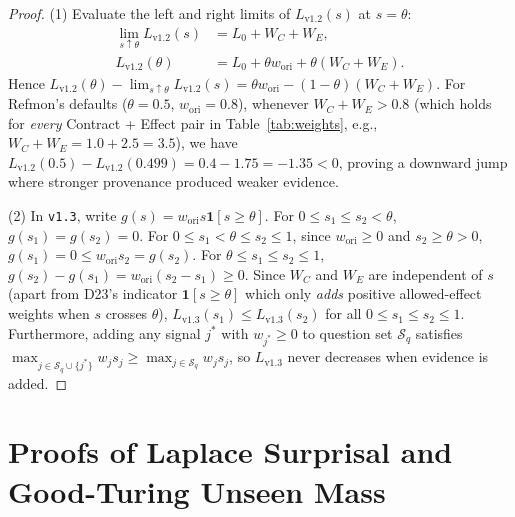 \documentclass[10pt,twocolumn,letterpaper]{article}
\makeatletter
\theoremstyle{plain}
\theoremstyle{definition}
\theoremstyle{remark}
\DeclareRobustCommand{\_}{\ifmmode\nfss@text{\textunderscore}\else\textunderscore\penalty\@highpenalty\hskip\z@skip\fi}
\makeatother
\begin{document}
\begin{proof}
(1) Evaluate the left and right limits of $L_{\text{v1.2}}(s)$ at $s = \theta$:
\begin{align*}
  \lim_{s \uparrow \theta} L_{\text{v1.2}}(s) &= L_0 + W_C + W_E,\\
  L_{\text{v1.2}}(\theta) &= L_0 + \theta w_{\text{ori}} + \theta(W_C + W_E).
\end{align*}
Hence $L_{\text{v1.2}}(\theta) - \lim_{s \uparrow \theta} L_{\text{v1.2}}(s) = \theta w_{\text{ori}} - (1 - \theta)(W_C + W_E)$. For Refmon's defaults ($\theta = 0.5$, $w_{\text{ori}} = 0.8$), whenever $W_C + W_E > 0.8$ (which holds for \emph{every} Contract + Effect pair in Table~\ref{tab:weights}, e.g., $W_C + W_E = 1.0 + 2.5 = 3.5$), we have $L_{\text{v1.2}}(0.5) - L_{\text{v1.2}}(0.499) = 0.4 - 1.75 = -1.35 < 0$, proving a downward jump where stronger provenance produced weaker evidence.

(2) In \texttt{v1.3}, write $g(s) = w_{\text{ori}} s \mathbf{1}[s \ge \theta]$. For $0 \le s_1 \le s_2 < \theta$, $g(s_1) = g(s_2) = 0$. For $0 \le s_1 < \theta \le s_2 \le 1$, since $w_{\text{ori}} \ge 0$ and $s_2 \ge \theta > 0$, $g(s_1) = 0 \le w_{\text{ori}} s_2 = g(s_2)$. For $\theta \le s_1 \le s_2 \le 1$, $g(s_2) - g(s_1) = w_{\text{ori}}(s_2 - s_1) \ge 0$. Since $W_C$ and $W_E$ are independent of $s$ (apart from D23's indicator $\mathbf{1}[s \ge \theta]$ which only \emph{adds} positive allowed-effect weights when $s$ crosses $\theta$), $L_{\text{v1.3}}(s_1) \le L_{\text{v1.3}}(s_2)$ for all $0 \le s_1 \le s_2 \le 1$. Furthermore, adding any signal $j^*$ with $w_{j^*} \ge 0$ to question set $\mathcal{S}_q$ satisfies $\max_{j \in \mathcal{S}_q \cup \{j^*\}} w_j s_j \ge \max_{j \in \mathcal{S}_q} w_j s_j$, so $L_{\text{v1.3}}$ never decreases when evidence is added.
\end{proof}

\section{Proofs of Laplace Surprisal and Good-Turing Unseen Mass}
\label{app:rarity}
\end{document}
